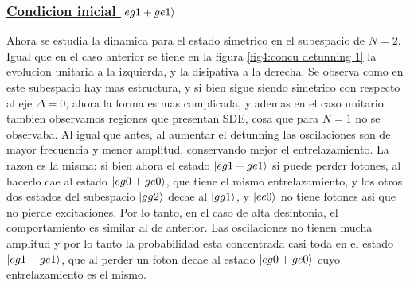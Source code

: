 \subsubsection{\underline{Condicion inicial $\ket{eg1+ge1}$}}
Ahora se estudia la dinamica para el estado simetrico en el subespacio de $N=2$. Igual que en el caso anterior se tiene en la figura \ref{fig4:concu detunning 1} la evolucion unitaria a la izquierda, y la disipativa a la derecha. Se observa como en este subespacio hay mas estructura, y si bien sigue siendo simetrico con respecto al eje $\Delta=0$, ahora la forma es mas complicada, y ademas en el caso unitario tambien observamos regiones que presentan SDE, cosa que para $N=1$ no se observaba. Al igual que antes, al aumentar el detunning las oscilaciones son de mayor frecuencia y menor amplitud, conservando mejor el entrelazamiento. La razon es la misma: si bien ahora el estado $\ket{eg1+ge1}$ si puede perder fotones, al hacerlo cae al estado $\ket{eg0+ge0}$, que tiene el mismo entrelazamiento, y los otros dos estados del subespacio $\ket{gg2}$ decae al $\ket{gg1}$, y $\ket{ee0}$ no tiene fotones asi que no pierde excitaciones. Por lo tanto, en el caso de alta desintonia, el comportamiento es similar al de anterior. Las oscilaciones no tienen mucha amplitud y por lo tanto la probabilidad esta concentrada casi toda en el estado $\ket{eg1+ge1}$, que al perder un foton decae al estado $\ket{eg0+ge0}$ cuyo entrelazamiento es el mismo.
